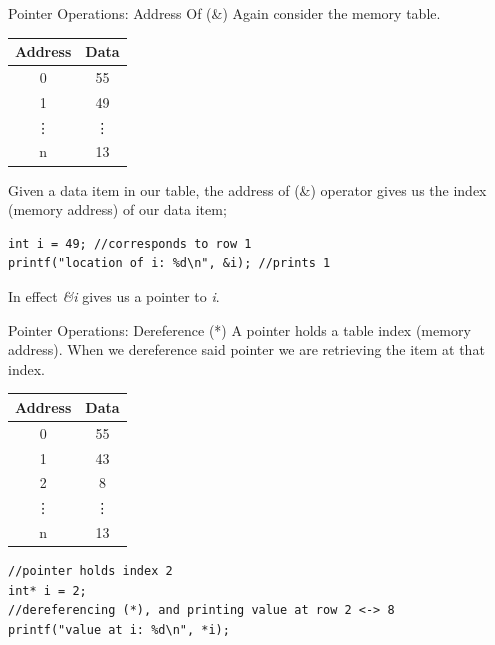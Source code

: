 \documentclass{beamer}
\begin{document}
\begin{frame}[fragile]{Pointer Operations: Address Of (\&)}
	Again consider the memory table.

	\begin{tabular}{|c|c|}
		\hline
		Address & Data\\
		\hline
		0 & 55 \\
		\hline
		1 & 49 \\
		\hline
		\vdots & \vdots \\
		\hline
		n & 13\\
		\hline
	\end{tabular}

	Given a data item in our table, the address of (\&) operator gives us the index (memory address) of our data item;

\begin{verbatim}
int i = 49; //corresponds to row 1
printf("location of i: %d\n", &i); //prints 1
\end{verbatim}
In effect {\it \&i} gives us a pointer to {\it i}.

\end{frame}

\begin{frame}[fragile]{Pointer Operations: Dereference (*)}
A pointer holds a table index (memory address). When we dereference said pointer we are retrieving the item at that index.

\begin{tabular}{|c|c|}
		\hline
		Address & Data\\
		\hline
		0 & 55 \\
		\hline
		1 & 43 \\
		\hline
		2 & 8 \\
		\hline
		\vdots & \vdots \\
		\hline
		n & 13\\
		\hline
	\end{tabular}
\begin{verbatim}
//pointer holds index 2
int* i = 2;
//dereferencing (*), and printing value at row 2 <-> 8
printf("value at i: %d\n", *i);
\end{verbatim}
\end{frame}
\end{document}
